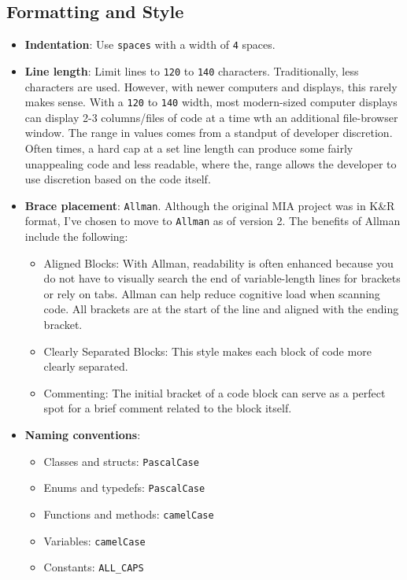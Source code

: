 \subsection{Formatting and Style}
\begin{itemize}\itemsep0em
    \item \textbf{Indentation}: Use \texttt{spaces} with a width of \texttt{4} spaces.
    \item \textbf{Line length}: Limit lines to \texttt{120} to \texttt{140} characters. Traditionally, less characters are used. However, with newer computers and displays, this rarely makes sense. With a \texttt{120} to \texttt{140} width, most modern-sized computer displays can display 2-3 columns/files of code at a time wth an additional file-browser window. The range in values comes from a standput of developer discretion. Often times, a hard cap at a set line length can produce some fairly unappealing code and less readable, where the, range allows the developer to use discretion based on the code itself. 
    \item \textbf{Brace placement}: \texttt{Allman}. Although the original MIA project was in K\&R format, I've chosen to move to \texttt{Allman} as of version 2. The benefits of Allman include the following:    
    \begin{itemize}\itemsep0em
        \item Aligned Blocks: With Allman, readability is often enhanced because you do not have to visually search the end of variable-length lines for brackets or rely on tabs. Allman can help reduce cognitive load when scanning code. All brackets are at the start of the line and aligned with the ending bracket. 
        \item Clearly Separated Blocks: This style makes each block of code more clearly separated.
        \item Commenting: The initial bracket of a code block can serve as a perfect spot for a brief comment related to the block itself. 
    \end{itemize}
    \item \textbf{Naming conventions}:
    \begin{itemize}\itemsep0em
        \item Classes and structs: \texttt{PascalCase}
        \item Enums and typedefs: \texttt{PascalCase}
        \item Functions and methods: \texttt{camelCase}
        \item Variables: \texttt{camelCase}
        \item Constants: \texttt{ALL\_CAPS} 
    \end{itemize}
\end{itemize}

